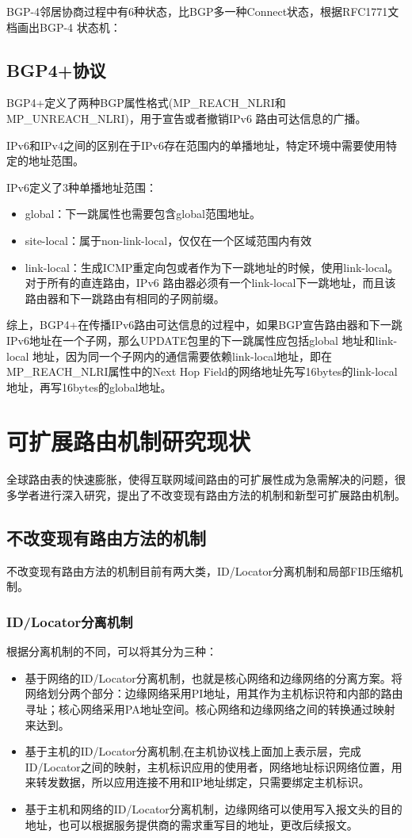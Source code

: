 BGP-4邻居协商过程中有6种状态，比BGP多一种Connect状态，根据RFC1771\cite{RFCBGP4}文档画出BGP-4 状态机：

\subsection{BGP4+协议}
BGP4+\cite{RFCBGP4plus}定义了两种BGP属性格式(MP\_REACH\_NLRI和MP\_UNREACH\_NLRI)，用于宣告或者撤销IPv6 路由可达信息的广播。

IPv6和IPv4之间的区别在于IPv6存在范围内的单播地址，特定环境中需要使用特定的地址范围。

IPv6定义了3种单播地址范围：

\begin{itemize}
\item global：下一跳属性也需要包含global范围地址。
\item site-local：属于non-link-local，仅仅在一个区域范围内有效
\item link-local：生成ICMP重定向包或者作为下一跳地址的时候，使用link-local。对于所有的直连路由，IPv6 路由器必须有一个link-local下一跳地址，而且该路由器和下一跳路由有相同的子网前缀。
\end{itemize}

综上，BGP4+在传播IPv6路由可达信息的过程中，如果BGP宣告路由器和下一跳IPv6地址在一个子网，那么UPDATE包里的下一跳属性应包括global 地址和link-local 地址，因为同一个子网内的通信需要依赖link-local地址，即在MP\_REACH\_NLRI属性中的Next Hop Field的网络地址先写16bytes的link-local 地址，再写16bytes的global地址。

\section{可扩展路由机制研究现状}
全球路由表的快速膨胀，使得互联网域间路由的可扩展性成为急需解决的问题，很多学者进行深入研究，提出了不改变现有路由方法的机制和新型可扩展路由机制。
\subsection{不改变现有路由方法的机制}
不改变现有路由方法的机制目前有两大类，ID/Locator分离机制和局部FIB压缩机制。
\subsubsection{ID/Locator分离机制}
根据分离机制的不同，可以将其分为三种\cite{Identificationroute}：
\begin{itemize}
\item 基于网络的ID/Locator分离机制，也就是核心网络和边缘网络的分离方案。将网络划分两个部分：边缘网络采用PI地址，用其作为主机标识符和内部的路由寻址；核心网络采用PA地址空间。核心网络和边缘网络之间的转换通过映射来达到。
\item 基于主机的ID/Locator分离机制,在主机协议栈上面加上表示层，完成ID/Locator之间的映射，主机标识应用的使用者，网络地址标识网络位置，用来转发数据，所以应用连接不用和IP地址绑定，只需要绑定主机标识。
\item 基于主机和网络的ID/Locator分离机制，边缘网络可以使用写入报文头的目的地址，也可以根据服务提供商的需求重写目的地址，更改后续报文。
\end{itemize}
